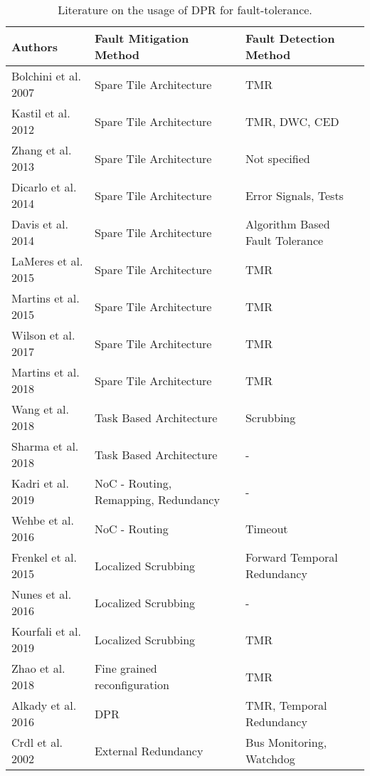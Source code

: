 \begin{table*}
    \centering
    \caption{Literature on the usage of \gls{DPR} for fault-tolerance.}
    \label{tbl:literatureOverview}
    \begin{tabular*}{\textwidth}{@{\extracolsep{\fill}}lll}
        \toprule
       \textbf{Authors} & \textbf{Fault Mitigation Method} & \textbf{Fault Detection Method} \\
       \midrule
       \cite{bolchini2007} Bolchini et al. 2007             & Spare Tile Architecture      & TMR  \\
       \cite{kastil2012} Kastil et al. 2012                 & Spare Tile Architecture      & TMR, DWC, CED  \\
       \cite{zhang2013} Zhang et al. 2013                   & Spare Tile Architecture      & Not specified \\
       \cite{dicarlo2014} Dicarlo et al. 2014               & Spare Tile Architecture      & Error Signals, Tests \\
       \cite{davis2014} Davis et al. 2014                   & Spare Tile Architecture      & Algorithm Based Fault Tolerance \\
       \cite{lameres_radsat_2015} LaMeres et al. 2015       & Spare Tile Architecture      & TMR  \\
       \cite{martins_tmr_2015} Martins et al. 2015          & Spare Tile Architecture      & TMR  \\
       \cite{wilson_hybrid_2017} Wilson et al. 2017         & Spare Tile Architecture      & TMR  \\
       \cite{martins_dynamic_2018} Martins et al. 2018      & Spare Tile Architecture      & TMR  \\
       \cite{wang_dynamic_2018} Wang et al. 2018            & Task Based Architecture      & Scrubbing \\
       \cite{sharma_run-time_2018} Sharma et al. 2018       & Task Based Architecture      & - \\
       \cite{kadri_survey_2019} Kadri et al. 2019           & NoC - Routing, Remapping, Redundancy                        & - \\
       \cite{wehbe_secure_2016} Wehbe et al. 2016           & NoC - Routing               & Timeout\\
       \cite{frenkel2015} Frenkel et al. 2015               & Localized Scrubbing       & Forward Temporal Redundancy \\
       \cite{nunes_improving_2016} Nunes et al. 2016        & Localized Scrubbing         & - \\
       \cite{kourfali2019} Kourfali et al. 2019             & Localized Scrubbing           & TMR \\
       \cite{zhao_fine-grained_2018} Zhao et al. 2018       & Fine grained reconfiguration & TMR \\
       \cite{alkady_integration_2016} Alkady et al. 2016    & \gls{DPR}             & TMR, Temporal Redundancy \\
       \cite{crdl_fail-safe_2002} Crdl et al. 2002          & External Redundancy           & Bus Monitoring, Watchdog \\
       \bottomrule
    \end{tabular*}
\end{table*}
